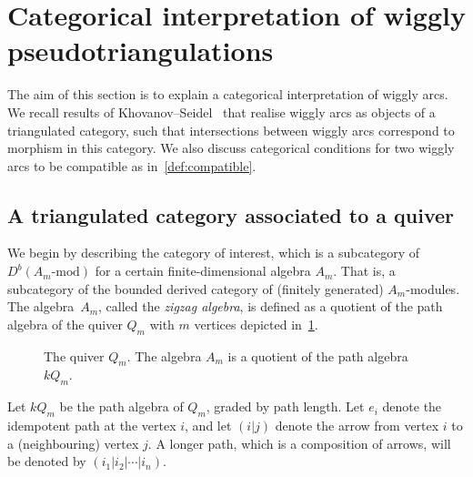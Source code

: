 \documentclass{amsart}
\theoremstyle{definition}
\newcommand{\darkblue}{\color{darkblue}} %
\newcommand{\defn}[1]{\textsl{\darkblue #1}} %
\begin{document}
\section{Categorical interpretation of wiggly pseudotriangulations}
The aim of this section is to explain a categorical interpretation of wiggly arcs.
We recall results of Khovanov--Seidel~\cite{kho.sei:02} that realise wiggly arcs as objects of a triangulated category, such that intersections between wiggly arcs correspond to morphism in this category.
We also discuss categorical conditions for two wiggly arcs to be compatible as in~\cref{def:compatible}.


\subsection{A triangulated category associated to a quiver}
We begin by describing the category of interest, which is a subcategory of \(D^b(A_m\text{-mod})\) for a certain finite-dimensional algebra \(A_m\).
That is, a subcategory of the bounded derived category of (finitely generated) \(A_m\)-modules.
The algebra~\(A_m\), called the \defn{zigzag algebra}, is defined as a quotient of the path algebra of the quiver \(Q_m\) with \(m\) vertices depicted in~\cref{fig:am-quiver}.
\begin{figure}[h]
  \centering
  \caption{The quiver \(Q_m\). The algebra \(A_m\) is a quotient of the path algebra \(kQ_m\).}
  \label{fig:am-quiver}
\end{figure}
Let \(kQ_m\) be the path algebra of \(Q_m\), graded by path length.
Let \(e_i\) denote the idempotent path at the vertex \(i\), and let \((i|j)\) denote the arrow from vertex \(i\) to a (neighbouring) vertex \(j\).
A longer path, which is a composition of arrows, will be denoted by \((i_1|i_2|\cdots|i_n)\).
\end{document}
